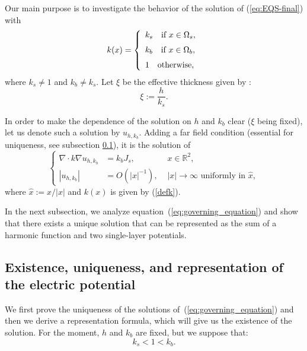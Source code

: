 Our main purpose is to investigate the behavior of the solution of
(\ref{eq:EQS-final}) with
\begin{equation} \label{defk}
k(x)=\left\{\begin{array}{l} k_s \quad \mbox{if } x \in \Omega_s,\\
\nm k_b \quad \mbox{if } x \in \Omega_b,\\
\nm 1 \quad \mbox{otherwise},
\end{array}
\right.
\end{equation}
where $k_s \neq 1$ and $k_b \neq k_s$. Let $\xi$ be the effective
thickness given by \cite{assad1990hypercube}:
\begin{equation} \label{defxi}
\xi:=\frac{h}{k_{s}}.
\end{equation}

In order to make the dependence of the solution on $h$ and
$k_b$ clear ($\xi$ being fixed), let us denote such a solution by
$u_{h,k_{b}}$. Adding a far field condition (essential for
uniqueness, see subsection \ref{sub:existence-uniqueness}), it is
the solution of
\begin{equation}
\left\{ \begin{alignedat}{2}\nabla\cdot k\nabla u_{h,k_{b}} & = k_b J_s, & \,\, x\in\mathbb{R}^{2},\\
\left|u_{h,k_{b}} \right| & = {O}(\left|x\right|^{-1}), &
\,\,\left|x\right|\rightarrow\infty \text{ uniformly in }\hat{x},
\end{alignedat}
\right.\label{eq:governing_equation}
\end{equation}
 where $\hat{x}:=x/\left|x\right|$ and $k(x)$ is given by
 (\ref{defk}).

 In the next subsection, we analyze
equation~(\ref{eq:governing_equation}) and show that there exists
a unique solution that can be represented as the sum of a harmonic
function and two single-layer potentials.

\subsection{Existence, uniqueness, and representation of the
electric potential} \label{sub:existence-uniqueness}

We first prove  the uniqueness of the solutions
of~(\ref{eq:governing_equation}) and then we derive a
representation formula, which will give us the existence of the
solution. For the moment, $h$ and $k_{b}$ are fixed, but we
suppose that:
\begin{equation}
k_{s} < 1 < k_{b}.\label{eq:ordering_conductivities}
\end{equation}




